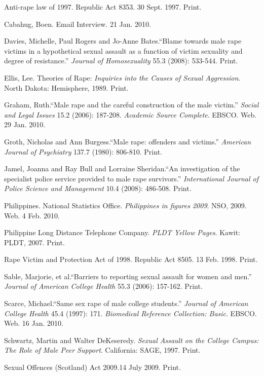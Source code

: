 \begin{workscited}

\bibent
Anti-rape law of 1997. Republic Act 8353. 30 Sept. 1997. Print.

\bibent
Cabahug, Boen. Email Interview. 21 Jan. 2010.
	
\bibent
Davies, Michelle, Paul Rogers and Jo-Anne Bates.``Blame towards male rape victims in a hypothetical sexual assault as a function of victim sexuality and degree of resistance.'' \textit{Journal of Homosexuality} 55.3 (2008): 533-544. Print.

\bibent
Ellis, Lee. Theories of Rape: \textit{Inquiries into the Causes of Sexual Aggression}. North Dakota: Hemisphere, 1989. Print.

\bibent
Graham, Ruth.``Male rape and the careful construction of the male victim.'' \textit{Social and Legal Issues} 15.2 (2006): 187-208. \textit{Academic Source Complete}. EBSCO. Web. 29 Jan. 2010.

\bibent
Groth, Nicholas and Ann Burgess.``Male rape: offenders and victims.'' \textit{American Journal of Psychiatry} 137.7 (1980): 806-810. Print.

\bibent
Jamel, Joanna and Ray Bull and Lorraine Sheridan.``An investigation of the specialist police service provided to male rape survivors.'' \textit{International Journal of Police Science and Management} 10.4 (2008): 486-508. Print.

\bibent
Philippines. National Statistics Office. \textit{Philippines in figures 2009}. NSO, 2009. Web. 4 Feb. 2010.

\bibent
Philippine Long Distance Telephone Company. \textit{PLDT Yellow Pages}. Kawit: PLDT, 2007. Print.

\bibent
Rape Victim and Protection Act of 1998. Republic Act 8505. 13 Feb. 1998. Print.

\bibent
Sable, Marjorie, et al.``Barriers to reporting sexual assault for women and men.'' \textit{Journal of American College Health} 55.3 (2006): 157-162. Print.

\bibent
Scarce, Michael.``Same sex rape of male college students.'' \textit{Journal of American College Health} 45.4 (1997): 171. \textit{Biomedical Reference Collection: Basic}. EBSCO. Web. 16 Jan. 2010.

\bibent
Schwartz, Martin and Walter DeKeseredy. \textit{Sexual Assault on the College Campus: The Role of Male Peer Support}. California: SAGE, 1997. Print.

\bibent
Sexual Offences (Scotland) Act 2009.14 July 2009. Print. 

\end{workscited}
